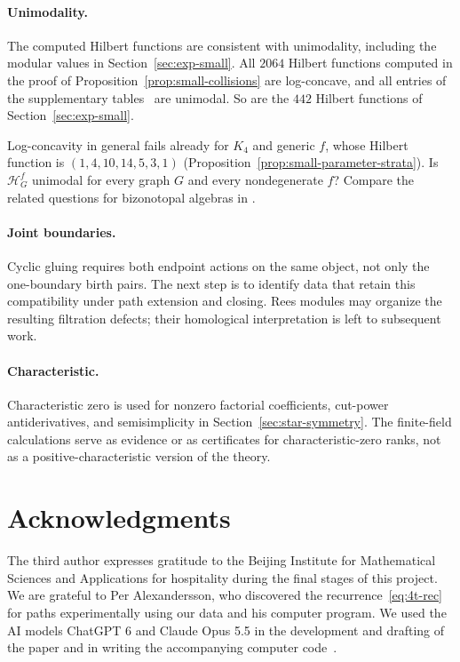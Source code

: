 \documentclass[reqno]{article}
\theoremstyle{plain} %
\theoremstyle{definition}
\theoremstyle{remark}
\newcommand{\hs}{\mathscr{H}}
\numberwithin{equation}{section}
\begin{document}
\paragraph{Unimodality.}
The computed Hilbert functions are consistent with unimodality, including the modular values in Section~\ref{sec:exp-small}. All $2064$ Hilbert functions computed in the proof of Proposition~\ref{prop:small-collisions} are log-concave,
and all entries of the supplementary tables~\cite[\texttt{tables/}]{Cert} are unimodal.
So are the $442$ Hilbert functions of Section~\ref{sec:exp-small}.

Log-concavity in general fails already for $K_4$ and
generic $f$, whose Hilbert function is $(1,4,10,14,5,3,1)$
(Proposition~\ref{prop:small-parameter-strata}). Is $\hs_G^f$ unimodal
for every graph $G$ and every nondegenerate $f$? Compare the related
questions for bizonotopal algebras in \cite[Section~5]{KNSV}.

\paragraph{Joint boundaries.}
Cyclic gluing requires both endpoint actions on the same object, not
only the one-boundary birth pairs. The next step is to identify data
that retain this compatibility under path extension and closing.
Rees modules may organize the resulting filtration defects; their
homological interpretation is left to subsequent work.

\paragraph{Characteristic.}
Characteristic zero is used for nonzero factorial coefficients,
cut-power antiderivatives, and semisimplicity in
Section~\ref{sec:star-symmetry}. The finite-field calculations serve as
evidence or as certificates for characteristic-zero ranks, not as a
positive-characteristic version of the theory.

\section*{Acknowledgments}
The third author expresses gratitude to the Beijing Institute for Mathematical Sciences and Applications for hospitality during
the final stages of this project.
%
We are grateful to Per Alexandersson, who discovered the recurrence~\eqref{eq:4t-rec} for paths experimentally using our data and his computer program.
%
We used the AI models ChatGPT 6 and Claude Opus 5.5 in the development and drafting of the paper
and in writing the accompanying computer code~\cite{Cert}.
\end{document}
